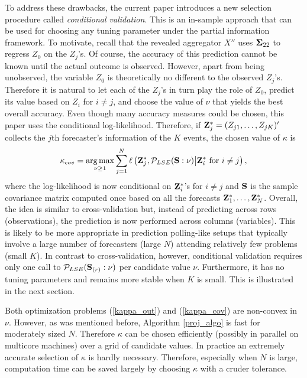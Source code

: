 \documentclass[11pt]{article}
\DeclareMathOperator*{\argmax}{arg\,max}
\theoremstyle{definition}
\theoremstyle{definition}
\def\bSigma{{\bf \Sigma}}
\def\Z{{\bf Z}}
\def\SS{{\bf S}}
\begin{document}
To address these drawbacks, the current paper introduces a new selection procedure called \textit{conditional validation}. This is an in-sample approach that can be used for choosing any tuning parameter under the partial information framework. To motivate, recall that the revealed aggregator $X''$ uses $\bSigma_{22}$ to regress  $Z_0$ on the $Z_{j}$'s. 
 Of course, the accuracy of this prediction cannot be known until the actual outcome is observed. However, apart from being unobserved, the variable $Z_0$ is theoretically no different to the observed $Z_{j}$'s. Therefore it is natural to let each of the $Z_{j}$'s in turn play the role of $Z_0$, predict its value based on $Z_{i}$ for $i \neq j$, and choose the value of $\nu$ that yields the best overall accuracy. Even though many accuracy measures could be chosen, this paper uses the conditional log-likelihood. Therefore, if $\Z_j^* = (Z_{j1}, \dots, Z_{jK})'$ collects the $j$th forecaster's information of the $K$ events, the chosen value of $\kappa$ is
  \begin{align}
\kappa_{cov} = \argmax_{\nu \geq 1} \sum_{j=1}^N \ell \left( \Z_{j}^*, \mathcal{P}_{LSE}(\SS : \nu) \big| \Z_i^* \text{ for } i \neq j\right), \label{kappa_cov}
\end{align}
where the log-likelihood is now conditional on $\Z_i^*$'s for $i \neq j$ and $\SS$ is the sample covariance matrix computed once based on all the forecasts $\Z_1^*, \dots, \Z_N^*$. Overall, the idea is similar to cross-validation but, instead of predicting across rows (observations), the prediction is now performed across columns (variables).  This is likely to be more appropriate in prediction polling-like setups that typically involve a large number of forecasters (large $N$) attending relatively few problems (small $K$). In contrast to cross-validation, however, conditional validation requires only one call to $\mathcal{P}_{LSE}(\SS_{(r)} : \nu)$ per candidate value $\nu$. Furthermore, it has no tuning parameters and remains more stable when $K$ is small. This is illustrated in the next section.


Both optimization problems (\ref{kappa_out}) and (\ref{kappa_cov}) are non-convex in $\nu$.  However, as was mentioned before, Algorithm \ref{proj_algo} is fast for moderately sized $N$. Therefore $\kappa$ can be chosen efficiently (possibly in parallel on multicore machines) over a  grid of candidate values.  In practice an extremely accurate selection of $\kappa$ is hardly necessary. Therefore, especially when $N$ is large, computation time can be saved largely by choosing $\kappa$ with a cruder tolerance. 
\end{document}
